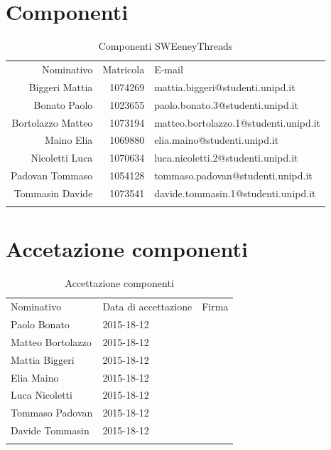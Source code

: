 \documentclass[a4paper]{report}
\begin{document}
\begin{appendices}
		\section{Componenti}
		\begin{table}[H]
			\begin{tabularx}{\textwidth}{r r k}
				Nominativo & Matricola & E-mail \\
				Biggeri Mattia & 1074269 & mattia.biggeri@studenti.unipd.it \\
				Bonato Paolo & 1023655 & paolo.bonato.3@studenti.unipd.it\\
				Bortolazzo Matteo & 1073194 & matteo.bortolazzo.1@studenti.unipd.it \\
				Maino Elia & 1069880 & elia.maino@studenti.unipd.it \\
				Nicoletti Luca & 1070634 & luca.nicoletti.2@studenti.unipd.it \\
				Padovan Tommaso & 1054128 & tommaso.padovan@studenti.unipd.it \\
				Tommasin Davide & 1073541 & davide.tommasin.1@studenti.unipd.it \\
			\end{tabularx}
			\caption{Componenti SWEeneyThreads } 
			\label{ComponentiGruppo}
		\end{table}
		\section{Accetazione componenti}
		\begin{table}[H]
			\begin{tabularx}{\textwidth}{Y Y Y}
				Nominativo & Data di accettazione & Firma\\
				Paolo Bonato & 2015-18-12 & \\
				Matteo Bortolazzo & 2015-18-12 & \\
				Mattia Biggeri & 2015-18-12 & \\
				Elia Maino & 2015-18-12 & \\
				Luca Nicoletti & 2015-18-12 & \\
				Tommaso Padovan & 2015-18-12 & \\
				Davide Tommasin & 2015-18-12 & \\
			\end{tabularx}
			\caption{Accettazione componenti } 
			\label{AccComponenti}
		\end{table}

\end{appendices}
\end{document}
